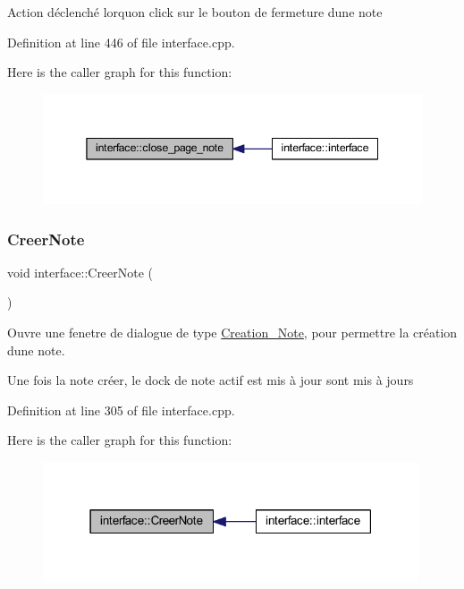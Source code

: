 Action déclenché lorqu\textquotesingle{}on click sur le bouton de fermeture d\textquotesingle{}une note 

Definition at line 446 of file interface.\+cpp.

Here is the caller graph for this function\+:\nopagebreak
\begin{figure}[H]
\begin{center}
\leavevmode
\includegraphics[width=345pt]{classinterface_abe2464522932a5d8ed76d1ba02c9d2c6_icgraph}
\end{center}
\end{figure}
\mbox{\label{classinterface_a23957135caad59d8850fe8e2cbee28a3}} 
\subsubsection{\texorpdfstring{Creer\+Note}{CreerNote}}
{\footnotesize\ttfamily void interface\+::\+Creer\+Note (\begin{DoxyParamCaption}{ }\end{DoxyParamCaption})\hspace{0.3cm}{\ttfamily [slot]}}



Ouvre une fenetre de dialogue de type \hyperlink{class_creation___note}{Creation\+\_\+\+Note}, pour permettre la création d\textquotesingle{}une note. 

Une fois la note créer, le dock de note actif est mis à jour sont mis à jours 

Definition at line 305 of file interface.\+cpp.

Here is the caller graph for this function\+:\nopagebreak
\begin{figure}[H]
\begin{center}
\leavevmode
\includegraphics[width=315pt]{classinterface_a23957135caad59d8850fe8e2cbee28a3_icgraph}
\end{center}
\end{figure}
\mbox{\label{classinterface_a319f133949e2be97a203f725c3f1e565}} 
